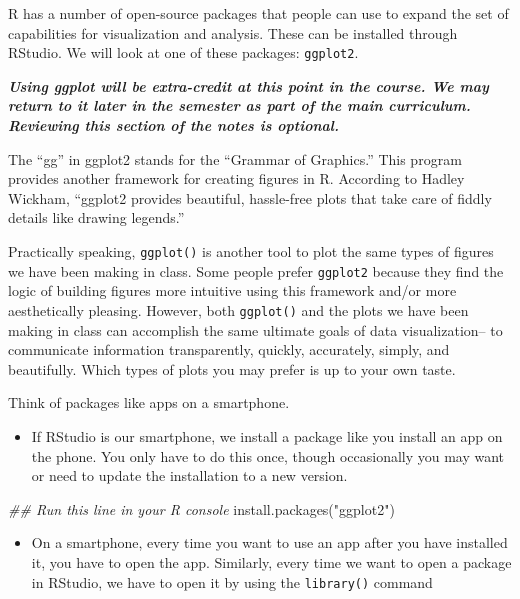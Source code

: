 \documentclass[
  letterpaper,
  DIV=11,
  numbers=noendperiod]{scrreprt}
\newenvironment{Shaded}{\begin{snugshade}}{\end{snugshade}}
\newcommand{\DocumentationTok}[1]{\textcolor[rgb]{0.37,0.37,0.37}{\textit{#1}}}
\newcommand{\FunctionTok}[1]{\textcolor[rgb]{0.28,0.35,0.67}{#1}}
\newcommand{\NormalTok}[1]{\textcolor[rgb]{0.00,0.23,0.31}{#1}}
\newcommand{\StringTok}[1]{\textcolor[rgb]{0.13,0.47,0.30}{#1}}
\providecommand{\tightlist}{%
  \setlength{\itemsep}{0pt}\setlength{\parskip}{0pt}}\usepackage{longtable,booktabs,array}
\begin{document}
R has a number of open-source packages that people can use to expand the
set of capabilities for visualization and analysis. These can be
installed through RStudio. We will look at one of these packages:
\texttt{ggplot2}.

\textbf{\emph{Using ggplot will be extra-credit at this point in the
course. We may return to it later in the semester as part of the main
curriculum. Reviewing this section of the notes is optional.}}

The ``gg'' in ggplot2 stands for the ``Grammar of Graphics.'' This
program provides another framework for creating figures in R. According
to Hadley Wickham, ``ggplot2 provides beautiful, hassle-free plots that
take care of fiddly details like drawing legends.''

Practically speaking, \texttt{ggplot()} is another tool to plot the same
types of figures we have been making in class. Some people prefer
\texttt{ggplot2} because they find the logic of building figures more
intuitive using this framework and/or more aesthetically pleasing.
However, both \texttt{ggplot()} and the plots we have been making in
class can accomplish the same ultimate goals of data visualization-- to
communicate information transparently, quickly, accurately, simply, and
beautifully. Which types of plots you may prefer is up to your own
taste.

Think of packages like apps on a smartphone.

\begin{itemize}
\tightlist
\item
  If RStudio is our smartphone, we install a package like you install an
  app on the phone. You only have to do this once, though occasionally
  you may want or need to update the installation to a new version.
\end{itemize}

\begin{Shaded}
\begin{Highlighting}[]
\DocumentationTok{\#\# Run this line in your R console}
\FunctionTok{install.packages}\NormalTok{(}\StringTok{"ggplot2"}\NormalTok{)}
\end{Highlighting}
\end{Shaded}

\begin{itemize}
\tightlist
\item
  On a smartphone, every time you want to use an app after you have
  installed it, you have to open the app. Similarly, every time we want
  to open a package in RStudio, we have to open it by using the
  \texttt{library()} command
\end{itemize}
\end{document}
